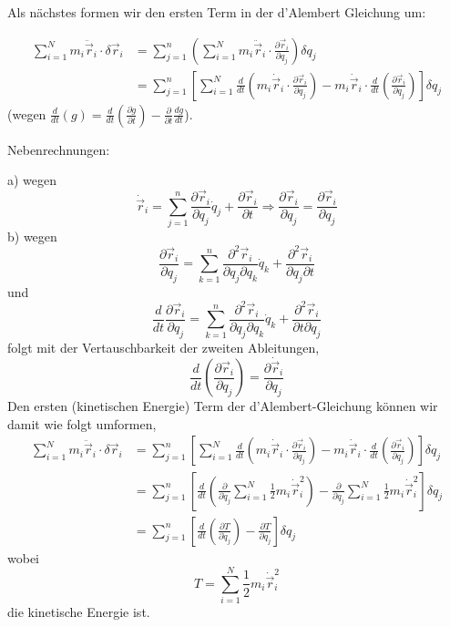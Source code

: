\documentclass[10pt, letterpaper]{article}
\begin{document}
Als nächstes formen wir den ersten Term in der d'Alembert Gleichung um:

\begin{align*}
\sum_{i=1}^N m_i\ddot{\vec{r}}_i \cdot \delta\vec{r}_i 
&= \sum_{j=1}^n \left( \sum_{i=1}^N m_i \ddot{\vec{r}}_i \cdot \frac{\partial \vec{r}_i}{\partial q_j} \right) \delta q_j \\
&= \sum_{j=1}^n \left[ \sum_{i=1}^N \frac{d}{dt} \left( m_i \dot{\vec{r}}_i \cdot \frac{\partial \vec{r}_i}{\partial q_j} \right)
    - m_i \dot{\vec{r}}_i \cdot \frac{d}{dt} \left( \frac{\partial \vec{r}_i}{\partial q_j} \right) \right] \delta q_j
\end{align*}
(wegen $\frac{d}{dt}(g) = \frac{d}{dt}(\frac{\partial g}{\partial t}) - \frac{\partial}{\partial t}\frac{dg}{dt}$).


Nebenrechnungen:

a) wegen 
$$\dot{\vec{r}}_i = \sum_{j=1}^n \frac{\partial\vec{r}_i}{\partial q_j} \dot{q}_j + \frac{\partial\vec{r}_i}{\partial t} \Rightarrow \frac{\partial\vec{r}_i}{\partial q_j} = \frac{\partial\vec{r}_i}{\partial q_j}$$
b) wegen 
$$\frac{\partial\vec{r}_i}{\partial q_j} = \sum_{k=1}^n \frac{\partial^2\vec{r}_i}{\partial q_j\partial q_k} \dot{q}_k + \frac{\partial^2\vec{r}_i}{\partial q_j\partial t}$$
und 
$$\frac{d}{dt} \frac{\partial\vec{r}_i}{\partial q_j} = \sum_{k=1}^n \frac{\partial^2\vec{r}_i}{\partial q_j\partial q_k} \dot{q}_k + \frac{\partial^2\vec{r}_i}{\partial t\partial q_j}$$
folgt mit der Vertauschbarkeit der zweiten Ableitungen,
$$\frac{d}{dt} \left(\frac{\partial\vec{r}_i}{\partial q_j}\right) = \frac{\partial \dot{\vec{r}}_i}{\partial q_j}$$ 
Den ersten (kinetischen Energie) Term der d'Alembert-Gleichung können wir damit wie folgt umformen,
\begin{align*}
\sum_{i=1}^N m_i\ddot{\vec{r}}_i \cdot \delta\vec{r}_i 
&= \sum_{j=1}^n \left[ \sum_{i=1}^N \frac{d}{dt} \left( m_i \dot{\vec{r}}_i \cdot \frac{\partial \vec{r}_i}{\partial q_j} \right)
  - m_i \dot{\vec{r}}_i \cdot \frac{d}{dt} \left( \frac{\partial \vec{r}_i}{\partial q_j} \right) \right] \delta q_j \\
&= \sum_{j=1}^n \left[ \frac{d}{dt} \left( \frac{\partial}{\partial \dot{q}_j} \sum_{i=1}^N \frac{1}{2} m_i \dot{\vec{r}}_i^2 \right)
  - \frac{\partial}{\partial q_j} \sum_{i=1}^N \frac{1}{2} m_i \dot{\vec{r}}_i^2 \right] \delta q_j \\
&= \sum_{j=1}^n \left[ \frac{d}{dt} \left( \frac{\partial T}{\partial \dot{q}_j} \right) - \frac{\partial T}{\partial q_j} \right] \delta q_j
\end{align*}
wobei $$T = \sum_{i=1}^N \frac{1}{2}m_i\dot{\vec{r}}_i^2$$ 
die kinetische Energie ist.
\end{document}
